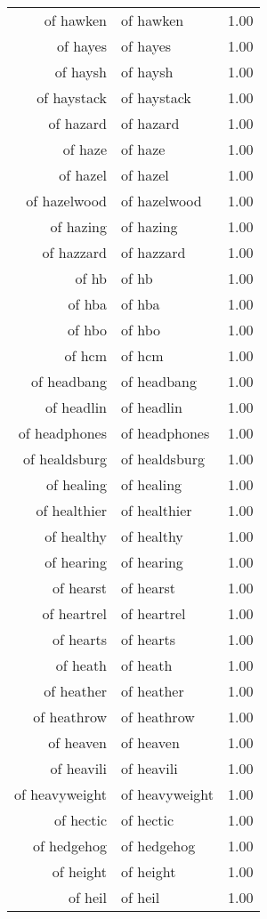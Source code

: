 \begin{table}[ht]
\begin{tabular}{rlr}
  of hawken & of hawken & 1.00 \\ 
  of hayes & of hayes & 1.00 \\ 
  of haysh & of haysh & 1.00 \\ 
  of haystack & of haystack & 1.00 \\ 
  of hazard & of hazard & 1.00 \\ 
  of haze & of haze & 1.00 \\ 
  of hazel & of hazel & 1.00 \\ 
  of hazelwood & of hazelwood & 1.00 \\ 
  of hazing & of hazing & 1.00 \\ 
  of hazzard & of hazzard & 1.00 \\ 
  of hb & of hb & 1.00 \\ 
  of hba & of hba & 1.00 \\ 
  of hbo & of hbo & 1.00 \\ 
  of hcm & of hcm & 1.00 \\ 
  of headbang & of headbang & 1.00 \\ 
  of headlin & of headlin & 1.00 \\ 
  of headphones & of headphones & 1.00 \\ 
  of healdsburg & of healdsburg & 1.00 \\ 
  of healing & of healing & 1.00 \\ 
  of healthier & of healthier & 1.00 \\ 
  of healthy & of healthy & 1.00 \\ 
  of hearing & of hearing & 1.00 \\ 
  of hearst & of hearst & 1.00 \\ 
  of heartrel & of heartrel & 1.00 \\ 
  of hearts & of hearts & 1.00 \\ 
  of heath & of heath & 1.00 \\ 
  of heather & of heather & 1.00 \\ 
  of heathrow & of heathrow & 1.00 \\ 
  of heaven & of heaven & 1.00 \\ 
  of heavili & of heavili & 1.00 \\ 
  of heavyweight & of heavyweight & 1.00 \\ 
  of hectic & of hectic & 1.00 \\ 
  of hedgehog & of hedgehog & 1.00 \\ 
  of height & of height & 1.00 \\ 
  of heil & of heil & 1.00 \\ 

\end{tabular}
\end{table}
